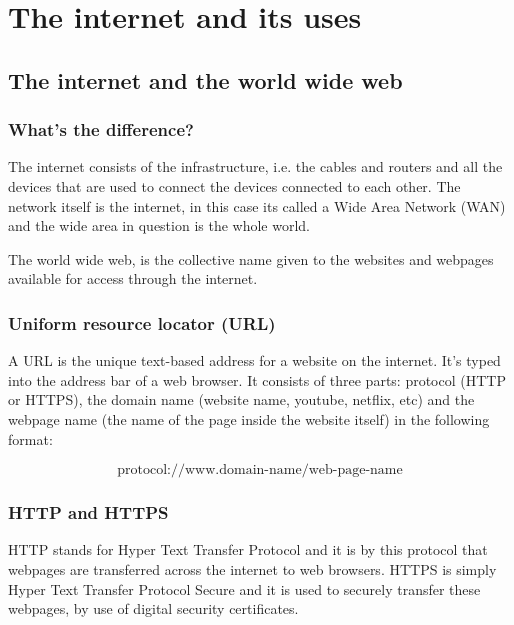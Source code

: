 \documentclass{article}
\begin{document}
\section{The internet and its uses}
\subsection{The internet and the world wide web}
\subsubsection{What's the difference?}
The internet consists of the infrastructure, i.e. the cables and routers and all the 
devices that are used to connect the devices connected to each other. The network
itself is the internet, in this case its called a Wide Area Network (WAN) and the wide
area in question is the whole world.

The world wide web, is the collective name given to the websites and webpages available
for access through the internet.

\subsubsection{Uniform resource locator (URL)}
A URL is the unique text-based address for a website on the internet. It's typed into
the address bar of a web browser. It consists of three parts: protocol (HTTP or HTTPS),
the domain name (website name, youtube, netflix, etc) and the webpage name (the name of
the page inside the website itself) in the following format:

\[\textrm{protocol://www.domain-name/web-page-name}\]

\subsubsection{HTTP and HTTPS}
HTTP stands for Hyper Text Transfer Protocol and it is by this protocol that webpages
are transferred across the internet to web browsers. HTTPS is simply Hyper Text Transfer
Protocol Secure and it is used to securely transfer these webpages, by use of digital
security certificates.
\end{document}

